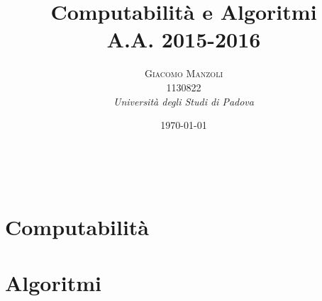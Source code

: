 \documentclass[a4paper, 11pt]{report} %
\title{\textbf{Computabilità e Algoritmi}\\ %
A.A. 2015-2016} %
\author{\textsc{Giacomo Manzoli}
\\ 1130822 %
\\{\textit{Università degli Studi di Padova}}} %
\date{\today} %
\makeatletter
\renewcommand{\maketitle}{ %
\begin{flushright} %
{\LARGE\@title} %

\vspace{50pt} %

{\large\@author} %
\\\@date %

\vspace{100pt} %
\end{flushright}
}
\makeatother
\begin{document}
\maketitle %



\clearpage
\tableofcontents
\listofalgorithms


\vspace{30pt} %

\clearpage

\part{Computabilità}
























\part{Algoritmi}




















\end{document}
